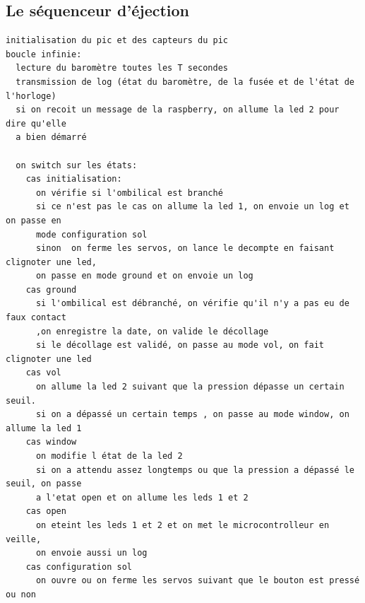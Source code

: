 \documentclass{article}
\begin{document}
\subsection*{Le séquenceur d'éjection}
\begin{verbatim}
initialisation du pic et des capteurs du pic
boucle infinie:
  lecture du baromètre toutes les T secondes
  transmission de log (état du baromètre, de la fusée et de l'état de l'horloge)
  si on recoit un message de la raspberry, on allume la led 2 pour dire qu'elle 
  a bien démarré
	
  on switch sur les états:
    cas initialisation:
      on vérifie si l'ombilical est branché
      si ce n'est pas le cas on allume la led 1, on envoie un log et on passe en
      mode configuration sol
      sinon  on ferme les servos, on lance le decompte en faisant clignoter une led,
      on passe en mode ground et on envoie un log
    cas ground
      si l'ombilical est débranché, on vérifie qu'il n'y a pas eu de faux contact
      ,on enregistre la date, on valide le décollage
      si le décollage est validé, on passe au mode vol, on fait clignoter une led
    cas vol
      on allume la led 2 suivant que la pression dépasse un certain seuil.
      si on a dépassé un certain temps , on passe au mode window, on allume la led 1
    cas window
      on modifie l état de la led 2
      si on a attendu assez longtemps ou que la pression a dépassé le seuil, on passe
      a l'etat open et on allume les leds 1 et 2
    cas open
      on eteint les leds 1 et 2 et on met le microcontrolleur en veille,
      on envoie aussi un log
    cas configuration sol
      on ouvre ou on ferme les servos suivant que le bouton est pressé ou non
			
			
	
	

\end{verbatim}
\end{document}
